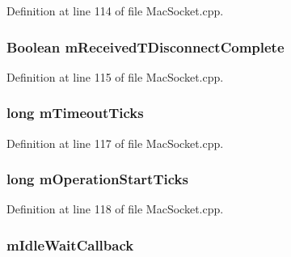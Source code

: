 Definition at line 114 of file Mac\+Socket.\+cpp.

\subsubsection[{\texorpdfstring{m\+Received\+T\+Disconnect\+Complete}{mReceivedTDisconnectComplete}}]{\setlength{\rightskip}{0pt plus 5cm}Boolean m\+Received\+T\+Disconnect\+Complete}\hypertarget{struct_socket_struct_a2852146af35864124736383a3fc5e305}{}\label{struct_socket_struct_a2852146af35864124736383a3fc5e305}


Definition at line 115 of file Mac\+Socket.\+cpp.

\subsubsection[{\texorpdfstring{m\+Timeout\+Ticks}{mTimeoutTicks}}]{\setlength{\rightskip}{0pt plus 5cm}long m\+Timeout\+Ticks}\hypertarget{struct_socket_struct_ad5246a549c7d7a3440f47b6f6071ce59}{}\label{struct_socket_struct_ad5246a549c7d7a3440f47b6f6071ce59}


Definition at line 117 of file Mac\+Socket.\+cpp.

\subsubsection[{\texorpdfstring{m\+Operation\+Start\+Ticks}{mOperationStartTicks}}]{\setlength{\rightskip}{0pt plus 5cm}long m\+Operation\+Start\+Ticks}\hypertarget{struct_socket_struct_ac739e32c6d9043018e2021f6b74f0ef2}{}\label{struct_socket_struct_ac739e32c6d9043018e2021f6b74f0ef2}


Definition at line 118 of file Mac\+Socket.\+cpp.

\subsubsection[{\texorpdfstring{m\+Idle\+Wait\+Callback}{mIdleWaitCallback}}]{ m\+Idle\+Wait\+Callback}\hypertarget{struct_socket_struct_a69f986725d1044656cb7cc5c6604f3b7}{}\label{struct_socket_struct_a69f986725d1044656cb7cc5c6604f3b7}


